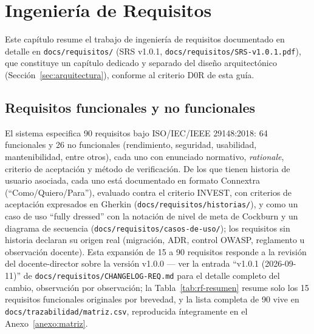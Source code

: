 \section{Ingeniería de Requisitos}
\label{sec:requisitos}

Este capítulo resume el trabajo de ingeniería de requisitos documentado en detalle en
\texttt{docs/requisitos/} (SRS v1.0.1, \texttt{docs/requisitos/SRS-v1.0.1.pdf}), que constituye un
capítulo dedicado y separado del diseño arquitectónico (Sección~\ref{sec:arquitectura}), conforme al
criterio D0R de esta guía.

\subsection{Requisitos funcionales y no funcionales}

El sistema especifica 90 requisitos bajo ISO/IEC/IEEE 29148:2018: 64 funcionales y 26 no funcionales
(rendimiento, seguridad, usabilidad, mantenibilidad, entre otros), cada uno con enunciado normativo,
\textit{rationale}, criterio de aceptación y método de verificación. De los que tienen historia de
usuario asociada, cada uno está documentado en formato Connextra (``Como/Quiero/Para''), evaluado contra
el criterio INVEST, con criterios de aceptación expresados en Gherkin
(\texttt{docs/requisitos/historias/}), y como un caso de uso ``fully dressed'' con la notación de nivel
de meta de Cockburn y un diagrama de secuencia (\texttt{docs/requisitos/casos-de-uso/}); los requisitos
sin historia declaran su origen real (migración, ADR, control OWASP, reglamento u observación docente).
Esta expansión de 15 a 90 requisitos responde a la revisión del docente-director sobre la versión
v1.0.0 --- ver la entrada ``v1.0.1 (2026-09-11)'' de \texttt{docs/requisitos/CHANGELOG-REQ.md} para el
detalle completo del cambio, observación por observación; la Tabla~\ref{tab:rf-resumen} resume solo los
15 requisitos funcionales originales por brevedad, y la lista completa de 90 vive en
\texttt{docs/trazabilidad/matriz.csv}, reproducida íntegramente en el Anexo~\ref{anexo:matriz}.

